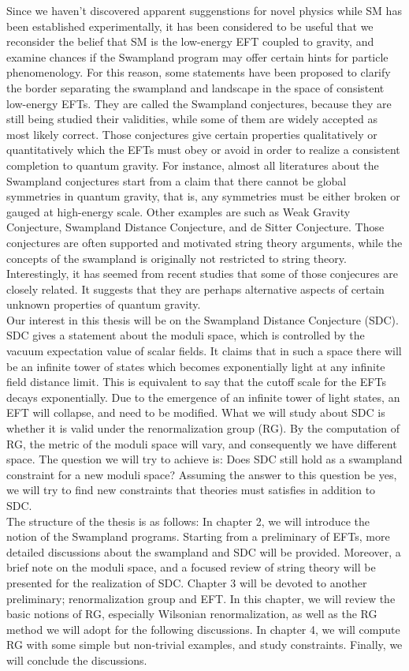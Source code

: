 \indent Since we haven't discovered apparent suggenstions for novel physics while SM has been established experimentally, it has been considered to be useful that we reconsider the belief that SM is the low-energy EFT coupled to gravity, and examine chances if the Swampland program may offer certain hints for particle phenomenology. For this reason, some statements have been proposed to clarify the border separating the swampland and landscape in the space of consistent low-energy EFTs. They are called the Swampland conjectures, because they are still being studied their validities, while some of them are widely accepted as most likely correct. Those conjectures give certain properties qualitatively or quantitatively which the EFTs must obey or avoid in order to realize a consistent completion to quantum gravity. For instance, almost all literatures about the Swampland conjectures start from a claim that there cannot be global symmetries in quantum gravity, that is, any symmetries must be either broken or gauged at high-energy scale. Other examples are such as Weak Gravity Conjecture, Swampland Distance Conjecture, and de Sitter Conjecture. Those conjectures are often supported and motivated string theory arguments, while the concepts of the swampland is originally not restricted to string theory. Interestingly, it has seemed from recent studies that some of those conjecures are closely related. It suggests that they are perhaps alternative aspects of certain unknown properties of quantum gravity. \\
\indent Our interest in this thesis will be on the Swampland Distance Conjecture (SDC). SDC gives a statement about the moduli space, which is controlled by the vacuum expectation value of scalar fields. It claims that in such a space there will be an infinite tower of states which becomes exponentially light at any infinite field distance limit. This is equivalent to say that the cutoff scale for the EFTs decays exponentially. Due to the emergence of an infinite tower of light states, an EFT will collapse, and need to be modified. What we will study about SDC is whether it is valid under the renormalization group (RG). By the computation of RG, the metric of the moduli space will vary, and consequently we have different space. The question we will try to achieve is: Does SDC still hold as a swampland constraint for a new moduli space? Assuming the answer to this question be yes, we will try to find new constraints that theories must satisfies in addition to SDC. \\
\indent The structure of the thesis is as follows: In chapter 2, we will introduce the notion of the Swampland programs. Starting from a preliminary of EFTs, more detailed discussions about the swampland and SDC will be provided. Moreover, a brief note on the moduli space, and a focused review of string theory will be presented for the realization of SDC. Chapter 3 will be devoted to another preliminary; renormalization group and EFT. In this chapter, we will review the basic notions of RG, especially Wilsonian renormalization, as well as the RG method we will adopt for the following discussions. In chapter 4, we will compute RG with some simple but non-trivial examples, and study constraints. Finally, we will conclude the discussions. 